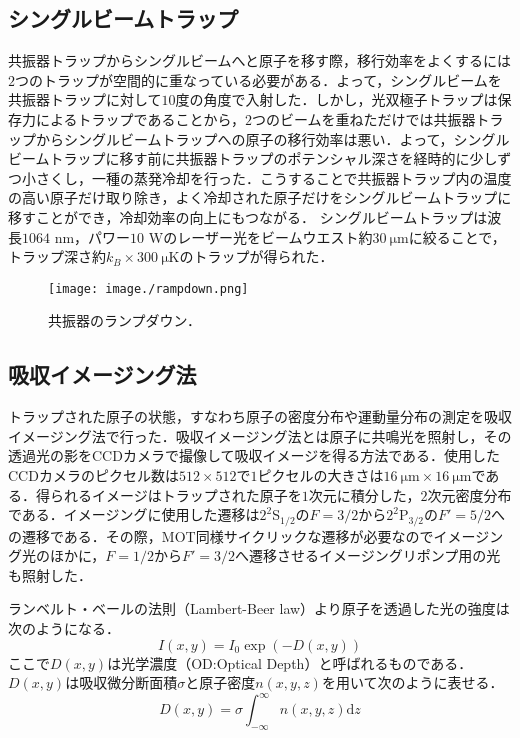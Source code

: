 \documentclass[11pt,a4j,notitlepage]{jreport}
\begin{document}
\subsection{シングルビームトラップ}
共振器トラップからシングルビームへと原子を移す際，移行効率をよくするには$2$つのトラップが空間的に重なっている必要がある．よって，シングルビームを共振器トラップに対して$10$度の角度で入射した．しかし，光双極子トラップは保存力によるトラップであることから，$2$つのビームを重ねただけでは共振器トラップからシングルビームトラップへの原子の移行効率は悪い．よって，シングルビームトラップに移す前に共振器トラップのポテンシャル深さを経時的に少しずつ小さくし，一種の蒸発冷却を行った．こうすることで共振器トラップ内の温度の高い原子だけ取り除き，よく冷却された原子だけをシングルビームトラップに移すことができ，冷却効率の向上にもつながる．
シングルビームトラップは波長$1064$ nm，パワー$10$ Wのレーザー光をビームウエスト約$30\ \mathrm{\mu m}$に絞ることで，トラップ深さ約$k_B \times 300\ \mathrm{\mu K}$のトラップが得られた．
\begin{figure}[h]
	\centering
		\texttt{[image: image./rampdown.png]}
	\caption{共振器のランプダウン．}
	\label{fig3.3.10}
\end{figure}

\subsection{吸収イメージング法}
トラップされた原子の状態，すなわち原子の密度分布や運動量分布の測定を吸収イメージング法で行った．吸収イメージング法とは原子に共鳴光を照射し，その透過光の影をCCDカメラで撮像して吸収イメージを得る方法である．使用したCCDカメラのピクセル数は$512 \times 512$で$1$ピクセルの大きさは$16 \ \mathrm{\mu m} \times 16 \ \mathrm{\mu m}$である．得られるイメージはトラップされた原子を$1$次元に積分した，$2$次元密度分布である．イメージングに使用した遷移は$2^2$S$_{1/2}$の$F=3/2$から$2^2$P$_{3/2}$の$F'=5/2$への遷移である．その際，MOT同様サイクリックな遷移が必要なのでイメージング光のほかに，$F=1/2$から$F'=3/2$へ遷移させるイメージングリポンプ用の光も照射した．

ランベルト・ベールの法則（Lambert-Beer law）より原子を透過した光の強度は次のようになる\cite{InaD}\cite{YoshiJun}．
\begin{equation}
	I(x, y)=I_{0} \exp (-D(x, y))
	\label{eq3.3.1}
\end{equation}
ここで$D(x, y)$は光学濃度（OD:Optical Depth）と呼ばれるものである．$D(x, y)$は吸収微分断面積$\sigma$と原子密度$n \left(x, y, z \right)$を用いて次のように表せる．
\begin{equation}
	D(x, y)=\sigma \int_{-\infty}^{\infty} n \left(x, y, z \right) \mathrm{d} z 
	\label{eq3.3.2}
\end{equation}
\end{document}
